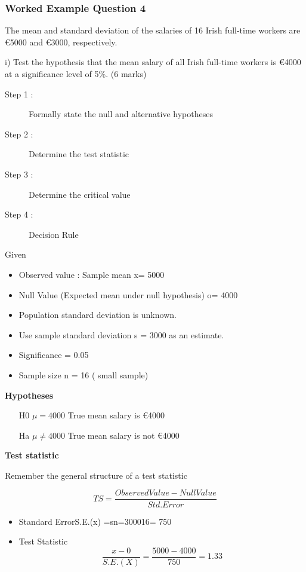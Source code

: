 \documentclass[]{report}
\begin{document}
\subsubsection{Worked Example Question 4}

The mean and standard deviation of the salaries of 16 Irish full-time workers are €5000  and €3000, respectively.

i)  Test the hypothesis that the mean salary of all Irish full-time workers is €4000 at a significance level of 5\%.   (6 marks)


\begin{description}
\item[Step 1 :] Formally state the null and alternative hypotheses
\item[Step 2 :] Determine the test statistic
\item[Step 3 :] Determine the critical value
\item[Step 4 :] Decision Rule
\end{description}



Given
\begin{itemize}
\item Observed value : Sample mean     x= 5000 
\item Null Value (Expected mean under null hypothesis)     o= 4000   
\item Population standard deviation is unknown.
\item Use sample standard deviation s = 3000 as an estimate.
\item Significance  = 0.05
\item Sample size n = 16  ( small sample)
\end{itemize}


\noindent \textbf{Hypotheses}
\begin{itemize}
\item[H0] $\mu=4000$    True mean salary is €4000
\item[Ha] $\mu \neq 4000$    True mean salary is  not €4000

\end{itemize}

\noindent \textbf{Test statistic}

Remember the general structure of a test statistic

\[TS =\frac{Observed Value-Null Value}{Std. Error} \]


\begin{itemize}
\item Standard ErrorS.E.(x) =sn=300016= 750

\item Test Statistic\[\frac{x-0}{S.E.(X)}=\frac{5000 -4 000}{750}= 1.33\]

\end{itemize}
\end{document}
